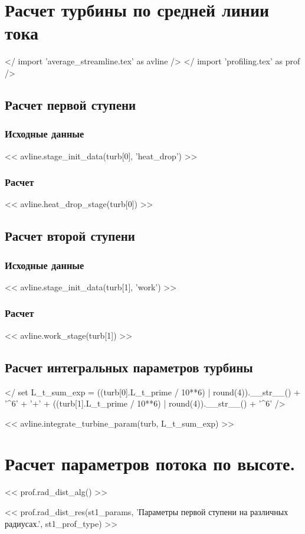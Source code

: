 \documentclass[a4paper,10pt]{article}
\begin{document}
    \section{Расчет турбины по средней линии тока}

    </ import 'average_streamline.tex' as avline />
    </ import 'profiling.tex' as prof />

    \subsection{Расчет первой ступени}

    \subsubsection{Исходные данные}

    << avline.stage_init_data(turb[0], 'heat_drop') >>

    \subsubsection{Расчет}

    << avline.heat_drop_stage(turb[0]) >>

    \subsection{Расчет второй ступени}

    \subsubsection{Исходные данные}

    << avline.stage_init_data(turb[1], 'work') >>

    \subsubsection{Расчет}

    << avline.work_stage(turb[1]) >>

    \subsection{Расчет интегральных параметров турбины}

    </ set L_t_sum_exp = ((turb[0].L_t_prime / 10**6) | round(4)).__str__() + '^6' + '+' +
        ((turb[1].L_t_prime / 10**6) | round(4)).__str__() + '^6' />

    << avline.integrate_turbine_param(turb, L_t_sum_exp) >>

    \section{Расчет параметров потока по высоте.}

    << prof.rad_dist_alg() >>

    << prof.rad_dist_res(st1_params, 'Параметры первой ступени на различных радиусах.', st1_prof_type) >>
\end{document}
